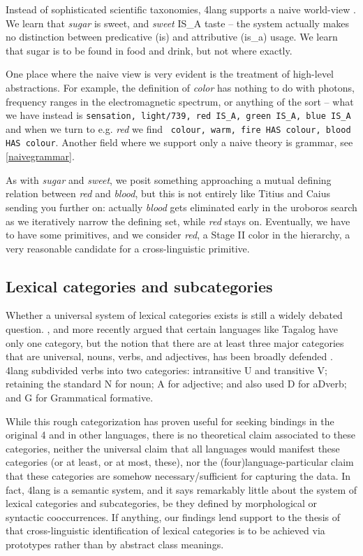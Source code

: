 \documentclass[11pt,bookmarks,bookmarksnumbered,naturalnames,plainpages=false,pdftex,colorlinks=true,urlcolor=blue,bookmarksdepth=subsection,plainpages=false]{paper}
\begin{document}
\noindent
Instead of sophisticated scientific taxonomies, 4lang supports a naive
world-view \citep{Hayes:1979,Gordon:2017}. We learn that {\it sugar} is sweet,
and {\it sweet} IS\_A taste -- the system actually makes no distinction
between predicative (is) and attributive (is\_a) usage. We learn that sugar is
to be found in food and drink, but not where exactly.

One place where the naive view is very evident is the treatment of high-level
abstractions. For example, the definition of {\it color} has nothing to do
with photons, frequency ranges in the electromagnetic spectrum, or anything of
the sort -- what we have instead is {\tt sensation, light/739, red IS\_A,
  green IS\_A, blue IS\_A} and when we turn to e.g. {\it red} we find {\tt
  colour, warm, fire HAS colour, blood HAS colour}. Another field where we
support only a naive theory is grammar, see \ref{naivegrammar}.

As with {\it sugar} and {\it sweet}, we posit something approaching a mutual
defining relation between {\it red} and {\it blood}, but this is not entirely
like Titius and Caius sending you further on: actually {\it blood} gets
eliminated early in the uroboros search as we iteratively narrow the defining
set, while {\it red} stays on. Eventually, we have to have some primitives,
and we consider {\it red}, a Stage II color in the \cite{Berlin:1969}
hierarchy, a very reasonable candidate for a cross-linguistic primitive.

\subsection{Lexical categories and subcategories}\label{lexcat}

Whether a universal system of lexical categories exists is still a widely
debated question. \cite{Bloomfield:1933}, and more recently
\cite{Kaufman:2009} argued that certain languages like Tagalog have only one
category, but the notion that there are at least three major categories that
are universal, nouns, verbs, and adjectives, has been broadly defended
\citep{Baker:2003,Chung:2012}. 4lang subdivided verbs into two categories:
intransitive U and transitive V; retaining the standard N for noun; A for
adjective; and also used D for aDverb; and G for Grammatical formative.

While this rough categorization has proven useful for seeking bindings in the
original 4 and in other languages, there is no theoretical claim associated to
these categories, neither the universal claim that all languages would
manifest these categories (or at least, or at most, these), nor the
(four)language-particular claim that these categories are somehow
necessary/sufficient for capturing the data. In fact, 4lang is a semantic
system, and it says remarkably little about the system of lexical categories
and subcategories, be they defined by morphological or syntactic
cooccurrences. If anything, our findings lend support to the thesis of
\cite{Wierzbicka:2000} that cross-linguistic identification of lexical
categories is to be achieved via prototypes rather than by abstract class
meanings. 
\end{document}

